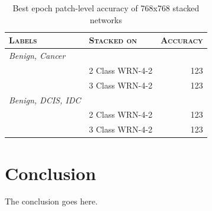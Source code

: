 \documentclass[journal]{IEEEtran}
\begin{document}
\begin{table}[!t]
\renewcommand{\arraystretch}{1.1}
\caption{Best epoch patch-level accuracy of 768x768 stacked networks}
\label{table_results_stacked}
\centering
\begin{tabular}{|llr|}
\hline
\textsc{Labels}&\textsc{Stacked on}&\textsc{Accuracy}\\
\hline
\textit{Benign, Cancer}&&\\
&2 Class WRN-4-2&  123\\
&3 Class WRN-4-2& 123\\
\hline
\textit{Benign, DCIS, IDC}&&\\
&2 Class WRN-4-2&  123\\
&3 Class WRN-4-2& 123\\
\hline
\end{tabular}
\end{table}




\section{Conclusion}
The conclusion goes here.






%
\end{document}
